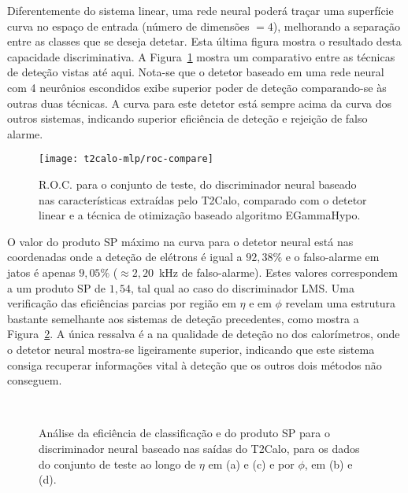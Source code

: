 Diferentemente do sistema linear, uma rede neural poderá traçar uma superfície
curva no espaço de entrada (número de dimensões $=4$), melhorando a separação
entre as classes que se deseja detetar. Esta última figura mostra o resultado
desta capacidade discriminativa. A Figura~\ref{fig:best-t2calo-test-roc}
mostra um comparativo entre as técnicas de deteção vistas até aqui. Nota-se
que o detetor baseado em uma rede neural com 4 neurônios escondidos exibe
superior poder de deteção comparando-se às outras duas técnicas. A curva para
este detetor está sempre acima da curva dos outros sistemas, indicando
superior eficiência de deteção e rejeição de falso alarme.

\begin{figure}
\begin{center}
\texttt{[image: t2calo-mlp/roc-compare]}
\end{center}
\caption{R.O.C. para o conjunto de teste, do discriminador neural baseado nas
características extraídas pelo T2Calo, comparado com o detetor linear e a
técnica de otimização baseado algoritmo EGammaHypo.}
\label{fig:best-t2calo-test-roc}
\end{figure}

O valor do produto SP máximo na curva para o detetor neural está nas
coordenadas onde a deteção de elétrons é igual a $92,38\%$ e o falso-alarme em
jatos é apenas $9,05\%$ ($\approx 2,20$~kHz de falso-alarme). Estes valores
correspondem a um produto SP de $1,54$, tal qual ao caso do discriminador
LMS. Uma verificação das eficiências parcias por região em $\eta$ e em $\phi$
revelam uma estrutura bastante semelhante aos sistemas de deteção precedentes,
como mostra a Figura~\ref{fig:best-t2calo-eta-phi}. A única ressalva é a na
qualidade de deteção no  dos calorímetros, onde o detetor neural
mostra-se ligeiramente superior, indicando que este sistema consiga recuperar
informações vital à deteção que os outros dois métodos não conseguem.

\begin{figure}
\begin{center}
\mbox{%
}
\mbox{%
}
\end{center}
\caption{Análise da eficiência de classificação e do produto SP para o
discriminador neural baseado nas saídas do T2Calo, para os dados do conjunto
de teste ao longo de $\eta$ em (a) e (c) e por $\phi$, em (b) e (d).}
\label{fig:best-t2calo-eta-phi}
\end{figure}

